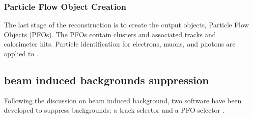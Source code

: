 
\subsubsection{Particle Flow Object Creation}
\label{sec:pandoraPFOcreation}

The last stage of the reconstruction is to create the output objects, Particle Flow Objects (PFOs). The PFOs contain clusters and associated tracks and calorimeter hits. Particle identification for electrons, muons, and photons are applied to \PFOs.




\subsection{\CLIC beam induced backgrounds suppression}




Following the discussion on \CLIC beam induced background,  two software have been developed to suppress \ggHad backgrounds: a track selector and a PFO selector \cite{Marshall:2012ry}.

